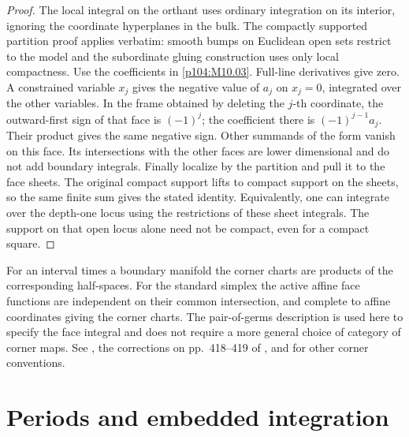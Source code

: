 \documentclass[11pt,oneside,openany]{book}
\theoremstyle{definition}
\theoremstyle{remark}
\begin{document}
\begin{proof}
The local integral on the orthant uses ordinary integration on
its interior, ignoring the coordinate hyperplanes in the bulk.
The compactly supported partition proof applies verbatim: smooth
bumps on Euclidean open sets restrict to the model and the
subordinate gluing construction uses only local compactness.
Use the coefficients in \cref{p104:M10.03}. Full-line derivatives
give zero. A constrained variable \(x_j\) gives the negative
value of \(a_j\) on \(x_j=0\), integrated over the other
variables. In the frame obtained by deleting the \(j\)-th
coordinate, the outward-first sign of that face is \((-1)^j\);
the coefficient there is \((-1)^{j-1}a_j\). Their product gives
the same negative sign. Other summands of the form vanish on
this face. Its intersections with the other faces are lower
dimensional and do not add boundary integrals. Finally localize
by the partition and pull it to the face sheets. The original
compact support lifts to compact support on the sheets, so the
same finite sum gives the stated identity. Equivalently, one
can integrate over the depth-one locus using the restrictions
of these sheet integrals. The support on that open locus alone
need not be compact, even for a compact square.
\end{proof}

For an interval times a boundary manifold the corner charts
are products of the corresponding half-spaces. For the standard
simplex the active affine face functions are independent on their
common intersection, and complete to affine coordinates giving
the corner charts. The pair-of-germs description is used here to
specify the face integral and does not require a more general
choice of category of corner maps. See
\cite[Chapter 16, pp.~415--419]{lee}, the corrections on
pp.~418--419 of \cite{leeerrata}, and \cite{joyce} for other
corner conventions.

\section{Periods and embedded integration}
\end{document}
